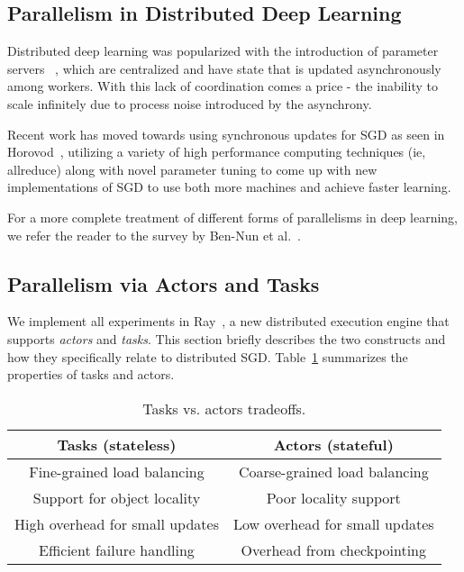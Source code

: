 \documentclass{article}
\begin{document}
\subsection{Parallelism in Distributed Deep Learning}
Distributed deep learning was popularized with the introduction of parameter servers ~\cite{param-server}, which are centralized and have state that is updated asynchronously among workers. With this lack of coordination comes a price - the inability to scale infinitely due to process noise introduced by the asynchrony.

Recent work has moved towards using synchronous updates for SGD as seen in Horovod~\cite{horovod}, utilizing a variety of high performance computing techniques (ie, allreduce) along with novel parameter tuning to come up with new implementations of SGD to use both more machines and achieve faster learning.

For a more complete treatment of different forms of parallelisms in deep learning, we refer the reader to the survey by Ben-Nun et al.~\cite{ben-nun18_demys_paral_distr_deep_learn}.

\subsection{Parallelism via Actors and Tasks}
We implement all experiments in Ray~\cite{ray}, a new distributed execution engine that supports \textit{actors} and \textit{tasks}.  This section briefly describes the two constructs and how they specifically relate to distributed SGD.
Table~\ref{table:tasks-vs-actors} summarizes the properties of tasks and actors.

\begin{table}[tbh]
\begin{center}
\begin{footnotesize}
\begin{tabular}{| c | c |}\hline
{\bf Tasks (stateless)} & {\bf Actors (stateful)} \\\hline
    Fine-grained load balancing & Coarse-grained load balancing \\\hline
    Support for object locality & Poor locality support \\\hline
    High overhead for small updates & Low overhead for small updates \\\hline
    Efficient failure handling & Overhead from checkpointing \\\hline
\end{tabular}
\end{footnotesize}
\end{center}
\vspace{-0.6cm}
    \caption{\small{Tasks vs. actors tradeoffs.}}
\label{table:tasks-vs-actors}
\end{table}
\end{document}
